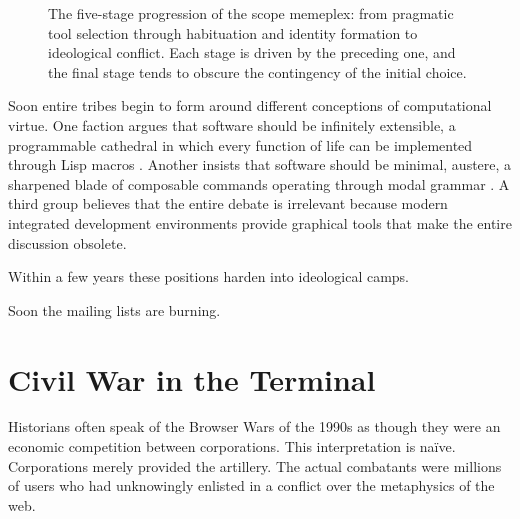 \documentclass[12pt]{article}
\theoremstyle{definition}
\begin{document}
\begin{figure}[h]
\centering
{}
\caption{The five-stage progression of the scope memeplex: from pragmatic
tool selection through habituation and identity formation to ideological
conflict. Each stage is driven by the preceding one, and the final stage
tends to obscure the contingency of the initial choice.}
\label{fig:memeplex_stages}
\end{figure}

Soon entire tribes begin to form around different conceptions of
computational virtue. One faction argues that software should be
infinitely extensible, a programmable cathedral in which every function
of life can be implemented through Lisp macros \cite{stallman2002}.
Another insists that software should be minimal, austere, a sharpened
blade of composable commands operating through modal grammar
\cite{mcilroy1978}. A third group believes that the entire debate is
irrelevant because modern integrated development environments provide
graphical tools that make the entire discussion obsolete.

Within a few years these positions harden into ideological camps.

Soon the mailing lists are burning.

\section{Civil War in the Terminal}

Historians often speak of the Browser Wars of the 1990s as though they
were an economic competition between corporations. This interpretation
is naïve. Corporations merely provided the artillery. The actual
combatants were millions of users who had unknowingly enlisted in a
conflict over the metaphysics of the web.
\end{document}
